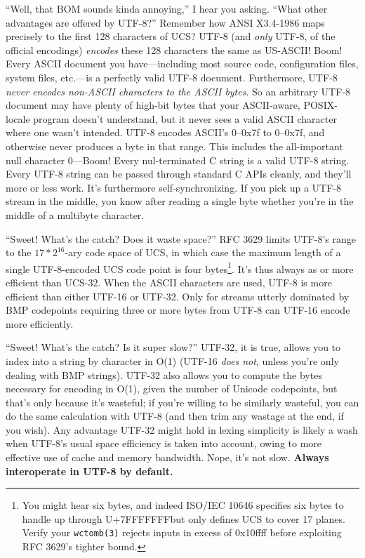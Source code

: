 ``Well, that BOM sounds kinda annoying,'' I hear you asking. ``What other
advantages are offered by UTF-8?'' Remember how ANSI X3.4-1986 maps precisely
to the first 128 characters of UCS? UTF-8 (and \textit{only} UTF-8, of
the official encodings) \textit{encodes} these 128 characters the same as
US-ASCII! Boom! Every ASCII document you have---including most source code,
configuration files, system files, etc.---is a perfectly valid UTF-8 document.
Furthermore, UTF-8 \textit{never encodes non-ASCII characters to the ASCII
bytes}. So an arbitrary UTF-8 document may have plenty of high-bit bytes that
your ASCII-aware, POSIX-locale program doesn't understand, but it never sees
a valid ASCII character where one wasn't intended. UTF-8 encodes ASCII's 0--0x7f
to 0--0x7f, and otherwise never produces a byte in that range. This includes
the all-important null character 0---Boom! Every nul-terminated C string is a
valid UTF-8 string. Every UTF-8 string can be passed through standard C APIs
cleanly, and they'll more or less work. It's furthermore self-synchronizing.
If you pick up a UTF-8 stream in the middle, you know after reading a single
byte whether you're in the middle of a multibyte character.

``Sweet! What's the catch? Does it waste space?'' RFC 3629\cite{rfc3629}
limits UTF-8's range to the $17*2^{16}$-ary code space of UCS, in which case
the maximum length of a single UTF-8-encoded UCS code point is four bytes\footnote{You
might hear six bytes, and indeed ISO/IEC 10646 specifies six bytes to handle
up through U+7FFFFFFF\textellipsis but only defines UCS to cover 17 planes.
Verify your \texttt{wctomb(3)} rejects inputs in excess of 0x10ffff before
exploiting RFC 3629's tighter bound.}. It's thus always as or more efficient
than UCS-32. When the ASCII characters are used, UTF-8 is more efficient than
either UTF-16 or UTF-32. Only for streams utterly dominated by BMP codepoints
requiring three or more bytes from UTF-8 can UTF-16 encode more efficiently.

``Sweet! What's the catch? Is it super slow?'' UTF-32, it is true, allows you
to index into a string by character in O(1) (UTF-16 \textit{does not}, unless
you're only dealing with BMP strings). UTF-32 also allows you to compute the
bytes necessary for encoding in O(1), given the number of Unicode codepoints,
but that's only because it's wasteful; if you're willing to be similarly
wasteful, you can do the same calculation with UTF-8 (and then trim any wastage
at the end, if you wish). Any advantage UTF-32 might hold in lexing simplicity
is likely a wash when UTF-8's usual space efficiency is taken into account,
owing to more effective use of cache and memory bandwidth. Nope, it's not slow.
\textbf{Always interoperate in UTF-8 by default.}

